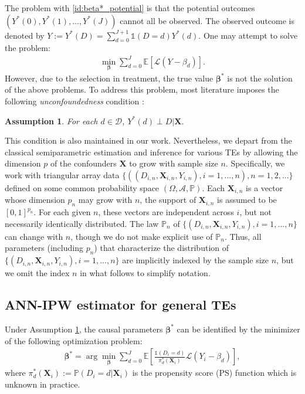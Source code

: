 \documentclass[11pt]{article}
\newtheorem{assumption}[]{Assumption}
\numberwithin{equation}{section}
\begin{document}
The problem with \eqref{id:beta*_potential} is that the potential outcomes $(Y^*(0),Y^*(1),...,Y^*(J))$ cannot all be
observed. The observed outcome is denoted by $Y:=Y^*(D)=\sum_{d=0}^{J+1}\mathds{1}(D=d)Y^*(d)$. One may attempt to solve the problem:
\begin{align*}
	\min_{\boldsymbol{\beta}}\sum_{d=0}^J\mathbb{E}\left[\mathcal{L}\left(Y-\beta_d\right)\right].
\end{align*}
However, due to the selection in treatment, the true value $\boldsymbol{\beta}^*$ is not the solution of the above problems. To address this problem, most literature imposes the following \emph{unconfoundedness} condition \citep{rosenbaum1983central}:
\begin{assumption}\label{as:CIA} For each $d\in \mathcal{D}$,
	$Y^*(d)\perp D|\boldsymbol{X}$.
\end{assumption}
This condition is also maintained in our work. Nevertheless, we depart from the classical semiparametric estimation and inference for various TEs by allowing the dimension $p$ of the confounders $\boldsymbol{X}$ to grow with sample size $n$. Specifically, we work with triangular array data $\{((D_{i,n},\boldsymbol{X}_{i,n},Y_{i,n}),i=1,...,n),n=1,2,...\}$  defined on some common probability space $(\Omega,\mathcal{A},\mathbb{P})$. Each $\boldsymbol{X}_{i,n}$ is a vector whose dimension $p_n$ may grow with $n$, the support of $\boldsymbol{X}_{i,n}$ is assumed to be $[0,1]^{p_n}$. For each given $n$, these vectors are independent across $i$, but not necessarily identically	distributed. The law $\mathbb{P}_n$ of $\{(D_{i,n},\boldsymbol{X}_{i,n},Y_{i,n}),i=1,...,n\}$ can change with $n$, though we do not make explicit use of $\mathbb{P}_n$. Thus, all parameters (including $p_n$) that characterize the distribution of $\{(D_{i,n},\boldsymbol{X}_{i,n},Y_{i,n}),i=1,...,n\}$  are implicitly indexed by the sample size $n$, but we omit the index $n$ in what follows to simplify notation.


\subsection{ANN-IPW estimator for general TEs}\label{IPW-TE}

Under Assumption \ref{as:CIA}, the causal parameters $\boldsymbol{\beta}^*$ can be identified by the minimizer of the following optimization problem:
\begin{align}\label{def:beta*_opt}
	\boldsymbol{\beta}^*=\arg\min_{\boldsymbol{\beta}}\sum_{d=0}^J\mathbb{E}\left[\frac{\mathds{1}(D_i=d)}{\pi^*_d(\boldsymbol{X}_{i})}\mathcal{L}\left(Y_i-\beta_d\right)\right],
\end{align}
where $\pi^*_d(\boldsymbol{X}_{i}):=\mathbb{P}(D_i=d|\boldsymbol{X}_{i})$ is the propensity score (PS) function which is unknown in practice.

\end{document}
